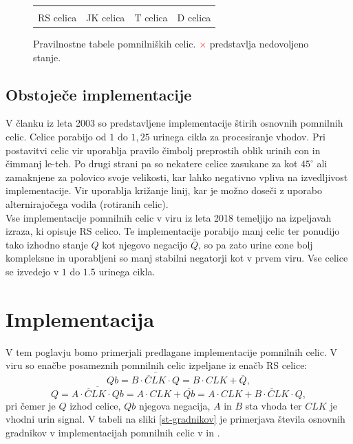 \documentclass[a4paper, 11pt]{article}
\begin{document}
\begin{figure}[h]
\begin{tabular}{cccc}
		\\ \\
		RS celica & JK celica & T celica & D celica \\
	\end{tabular}
	\caption{Pravilnostne tabele pomnilniških celic. \textcolor{Red}{$\times$} predstavlja nedovoljeno stanje.}
	\label{tab-cells-table}
\end{figure}


\subsection{Obstoječe implementacije}

V članku \cite{quantum_dot} iz leta 2003 so predstavljene implementacije štirih osnovnih pomnilnih celic. Celice porabijo od $1$ do $1,25$ urinega cikla za procesiranje vhodov. Pri postavitvi celic vir uporablja pravilo čimbolj preprostih oblik urinih con in čimmanj le-teh. Po drugi strani pa so nekatere celice zasukane za kot $ 45^{\circ} $ ali zamaknjene za polovico svoje velikosti, kar lahko negativno vpliva na izvedljivost implementacije. Vir uporablja križanje linij, kar je možno doseči z uporabo alternirajočega vodila (rotiranih celic). \\

Vse implementacije pomnilnih celic v viru \cite{a_novel_approach} iz leta 2018 temeljijo na izpeljavah izraza, ki opisuje RS celico. Te implementacije porabijo manj celic ter ponudijo tako izhodno stanje $Q$ kot njegovo negacijo $\bar{Q}$, so pa zato urine cone bolj kompleksne in uporabljeni so manj stabilni negatorji kot v prvem viru. Vse celice se izvedejo v $1$ do $1.5$ urinega cikla.



\section{Implementacija}

V tem poglavju bomo primerjali predlagane implementacije pomnilnih celic.
V viru \cite{a_novel_approach} so enačbe posameznih pomnilnih celic izpeljane iz enačb RS celice:
\begin{equation}
Qb = \overline{\overline{B \cdot CLK} \cdot Q} = B \cdot CLK + \overline{Q},
\label{eq-rs-qb}
\end{equation}
\begin{equation}
Q = \overline{\overline{A \cdot CLK} \cdot Qb} = A \cdot CLK + \overline{Qb} = A \cdot CLK + \overline{B \cdot CLK} \cdot Q,
\label{eq-rs-q}
\end{equation}
pri čemer je $Q$ izhod celice, $Qb$ njegova negacija, $A$ in $B$ sta vhoda ter $CLK$ je vhodni urin signal.
V tabeli na sliki \ref{st-gradnikov} je primerjava števila osnovnih gradnikov v implementacijah pomnilnih celic v \cite{a_novel_approach} in \cite{quantum_dot}.
\end{document}
